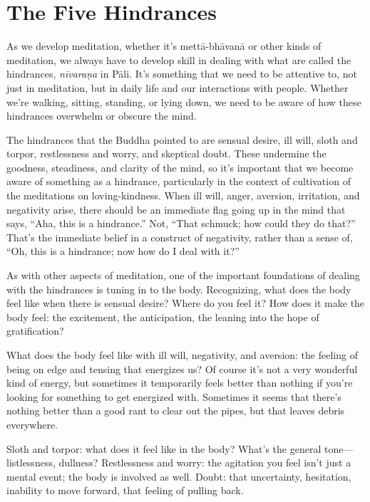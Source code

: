 \chapter{The Five Hindrances}

As we develop meditation, whether it’s mettā-bhāvanā or other kinds of
meditation, we always have to develop skill in dealing with what are
called the hindrances, \emph{nīvaraṇa} in Pāli. It’s something that we
need to be attentive to, not just in meditation, but in daily life and
our interactions with people. Whether we’re walking, sitting, standing,
or lying down, we need to be aware of how these hindrances overwhelm or
obscure the mind.

The hindrances that the Buddha pointed to are sensual desire, ill will,
sloth and torpor, restlessness and worry, and skeptical doubt. These
undermine the goodness, steadiness, and clarity of the mind, so it’s
important that we become aware of something as a hindrance, particularly
in the context of cultivation of the meditations on loving-kindness.
When ill will, anger, aversion, irritation, and negativity arise, there
should be an immediate flag going up in the mind that says, “Aha, this
is a hindrance.” Not, “That schmuck; how could they do that?” That’s the
immediate belief in a construct of negativity, rather than a sense of,
“Oh, this is a hindrance; now how do I deal with it?”

As with other aspects of meditation, one of the important foundations of
dealing with the hindrances is tuning in to the body. Recognizing, what
does the body feel like when there is sensual desire? Where do you feel
it? How does it make the body feel: the excitement, the anticipation,
the leaning into the hope of gratification?

What does the body feel like with ill will, negativity, and aversion:
the feeling of being on edge and tensing that energizes us? Of course
it’s not a very wonderful kind of energy, but sometimes it temporarily
feels better than nothing if you’re looking for something to get
energized with. Sometimes it seems that there’s nothing better than a
good rant to clear out the pipes, but that leaves debris everywhere.

Sloth and torpor: what does it feel like in the body? What’s the general
tone—listlessness, dullness? Restlessness and worry: the agitation you
feel isn’t just a mental event; the body is involved as well. Doubt:
that uncertainty, hesitation, inability to move forward, that feeling of
pulling back.

